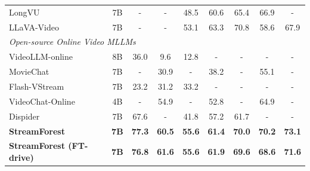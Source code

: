 \begin{table}[t]
{\begin{tabular}{lcccccccc}
            LongVU \cite{shen2024longvu} & \multicolumn{1}{c|}{7B} & - & - & \multicolumn{1}{c|}{48.5} & 60.6 & \multicolumn{1}{c|}{65.4} & 66.9 & - \\
            
            LLaVA-Video \cite{zhang2024llavavideo} & \multicolumn{1}{c|}{7B} & - & - & \multicolumn{1}{c|}{53.1} & 63.3 & \multicolumn{1}{c|}{70.8} & 58.6 & 67.9 \\ \hline
            
            \multicolumn{9}{l}{\textit{Open-source Online Video MLLMs}} \\ \hline
            
            VideoLLM-online \cite{chen2024videollmonline} & \multicolumn{1}{c|}{8B} & 36.0 & 9.6 & \multicolumn{1}{c|}{12.8} & - & \multicolumn{1}{c|}{-} & - & - \\
            
            MovieChat \cite{song2024moviechat} & \multicolumn{1}{c|}{7B} & - & 30.9 & \multicolumn{1}{c|}{-} & 38.2 & \multicolumn{1}{c|}{-} & 55.1 & - \\
            
            Flash-VStream \cite{zhang2024flashvstream} & \multicolumn{1}{c|}{7B} & 23.2 & 31.2 & \multicolumn{1}{c|}{33.2} & - & \multicolumn{1}{c|}{-} & - & - \\
            
            VideoChat-Online \cite{huang2024videochatonline} & \multicolumn{1}{c|}{4B} & - & 54.9 & \multicolumn{1}{c|}{-} & 52.8 & \multicolumn{1}{c|}{-} & 64.9 & - \\
            
            Dispider \cite{qian2025dispider} & \multicolumn{1}{c|}{7B} & 67.6 & - & \multicolumn{1}{c|}{41.8} & 57.2 & \multicolumn{1}{c|}{61.7} & - & - \\ 

            \rowcolor[HTML]{DFF7DC}
            \textbf{StreamForest} & \multicolumn{1}{c|}{\textbf{7B}} & \textbf{77.3} & \textbf{60.5} & \multicolumn{1}{c|}{\textbf{55.6}} & \textbf{61.4} & \multicolumn{1}{c|}{\textbf{70.0}} & \textbf{70.2} & \textbf{73.1} \\ 
            
            \rowcolor[HTML]{DFF7DC}
            \textbf{StreamForest (FT-drive)} & \multicolumn{1}{c|}{\textbf{7B}} & \textbf{76.8} & \textbf{61.6} & \multicolumn{1}{c|}{\textbf{55.6}} & \textbf{61.9} & \multicolumn{1}{c|}{\textbf{69.6}} & \textbf{68.6} & \textbf{71.6} \\ 
            
            \hline \hline
            
        \end{tabular}
    }
    

    
    \label{tab:Benchmark_Others}
\end{table}
